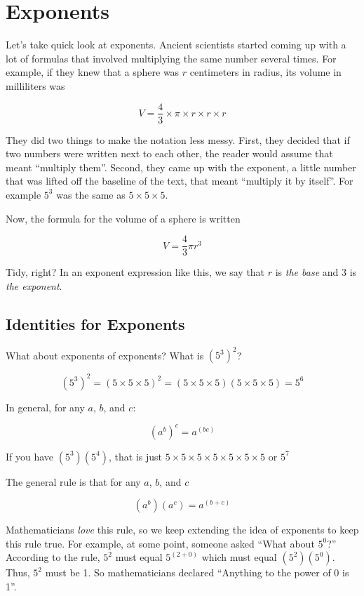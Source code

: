 \chapter{Exponents}

Let's take quick look at exponents. Ancient scientists started coming up
with a lot of formulas that involved multiplying the same number
several times. For example, if they knew that a sphere was $r$
centimeters in radius, its volume in milliliters was

$$V = \frac{4}{3} \times \pi \times r \times r \times r$$

They did two things to make the notation less messy. First, they
decided that if two numbers were written next to each other, the
reader would assume that meant ``multiply them''. Second, they came
up with the exponent, a little number that was lifted off the
baseline of the text, that meant ``multiply it by itself''. For
example $5^3$ was the same as $5 \times 5 \times 5$.

Now, the formula for the volume of a sphere is written

$$V = \frac{4}{3} \pi r^3$$

Tidy, right? In an exponent expression like this, we say that $r$ is
\textit{the base} and $3$ is \textit{the exponent}.

\section{Identities for Exponents}

What about exponents of exponents?  What is $\left(5^3\right)^2$?

$$\left(5^3\right)^2 = (5 \times 5 \times 5)^2 = (5 \times 5 \times 5)(5 \times 5 \times 5) = 5^6$$

In general, for any $a$, $b$, and $c$:

$$\left(a^b\right)^c = a^{(bc)}$$

If you have $\left( 5^3 \right) \left(5^4 \right)$, that is just $5 \times 5 \times 5 \times 5 \times 5 \times 5 \times 5$ or $5^7$

The general rule is that for any $a$, $b$, and $c$

$$\left(a^b\right)\left(a^c\right) = a^{(b + c)}$$

Mathematicians \textit{love} this rule, so we keep extending the idea
of exponents to keep this rule true. For example, at some point,
someone asked ``What about $5^0$?'' According to the rule, $5^{2}$
must equal $5^{(2 + 0)}$ which must equal
$\left(5^2\right)\left(5^0\right)$.  Thus, $5^2$ must be 1. So
mathematicians declared ``Anything to the power of 0 is 1''.

